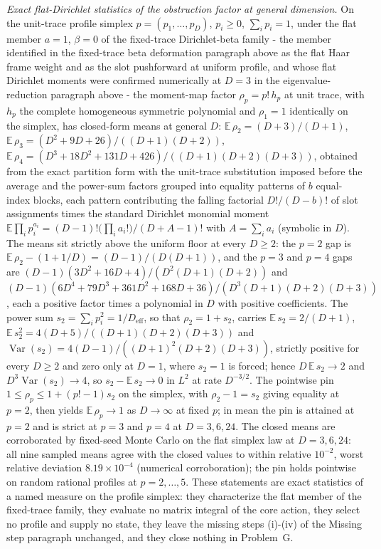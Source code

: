 \emph{Exact flat-Dirichlet statistics of the obstruction factor at general dimension.} On the unit-trace profile simplex \(p=(p_{1},\dots,p_{D})\), \(p_{i}\ge0\), \(\sum_{i}p_{i}=1\), under the flat member \(a=1\), \(\beta=0\) of the fixed-trace Dirichlet-beta family - the member identified in the fixed-trace beta deformation paragraph above as the flat Haar frame weight and as the slot pushforward at uniform profile, and whose flat Dirichlet moments were confirmed numerically at \(D=3\) in the eigenvalue-reduction paragraph above - the moment-map factor \(\rho_{p}=p!\,h_{p}\) at unit trace, with \(h_{p}\) the complete homogeneous symmetric polynomial and \(\rho_{1}=1\) identically on the simplex, has closed-form means at general \(D\): \(\mathbb{E}\,\rho_{2}=(D+3)/(D+1)\), \(\mathbb{E}\,\rho_{3}=(D^{2}+9D+26)/((D+1)(D+2))\), \(\mathbb{E}\,\rho_{4}=(D^{3}+18D^{2}+131D+426)/((D+1)(D+2)(D+3))\), obtained from the exact partition form with the unit-trace substitution imposed before the average and the power-sum factors grouped into equality patterns of \(b\) equal-index blocks, each pattern contributing the falling factorial \(D!/(D-b)!\) of slot assignments times the standard Dirichlet monomial moment \(\mathbb{E}\prod_{i}p_{i}^{a_{i}}=(D-1)!\bigl(\prod_{i}a_{i}!\bigr)/(D+A-1)!\) with \(A=\sum_{i}a_{i}\) (symbolic in \(D\)). The means sit strictly above the uniform floor at every \(D\ge2\): the \(p=2\) gap is \(\mathbb{E}\,\rho_{2}-(1+1/D)=(D-1)/(D(D+1))\), and the \(p=3\) and \(p=4\) gaps are \((D-1)(3D^{2}+16D+4)/(D^{2}(D+1)(D+2))\) and \((D-1)(6D^{4}+79D^{3}+361D^{2}+168D+36)/(D^{3}(D+1)(D+2)(D+3))\), each a positive factor times a polynomial in \(D\) with positive coefficients. The power sum \(s_{2}=\sum_{i}p_{i}^{2}=1/D_{\mathrm{eff}}\), so that \(\rho_{2}=1+s_{2}\), carries \(\mathbb{E}\,s_{2}=2/(D+1)\), \(\mathbb{E}\,s_{2}^{2}=4(D+5)/((D+1)(D+2)(D+3))\) and \(\operatorname{Var}(s_{2})=4(D-1)/((D+1)^{2}(D+2)(D+3))\), strictly positive for every \(D\ge2\) and zero only at \(D=1\), where \(s_{2}=1\) is forced; hence \(D\,\mathbb{E}\,s_{2}\to2\) and \(D^{3}\operatorname{Var}(s_{2})\to4\), so \(s_{2}-\mathbb{E}\,s_{2}\to0\) in \(L^{2}\) at rate \(D^{-3/2}\). The pointwise pin \(1\le\rho_{p}\le1+(p!-1)s_{2}\) on the simplex, with \(\rho_{2}-1=s_{2}\) giving equality at \(p=2\), then yields \(\mathbb{E}\,\rho_{p}\to1\) as \(D\to\infty\) at fixed \(p\); in mean the pin is attained at \(p=2\) and is strict at \(p=3\) and \(p=4\) at \(D=3,6,24\). The closed means are corroborated by fixed-seed Monte Carlo on the flat simplex law at \(D=3,6,24\): all nine sampled means agree with the closed values to within relative \(10^{-2}\), worst relative deviation \(8.19\times10^{-4}\) (numerical corroboration); the pin holds pointwise on random rational profiles at \(p=2,\dots,5\). These statements are exact statistics of a named measure on the profile simplex: they characterize the flat member of the fixed-trace family, they evaluate no matrix integral of the core action, they select no profile and supply no state, they leave the missing steps (i)-(iv) of the Missing step paragraph unchanged, and they close nothing in Problem~G.
